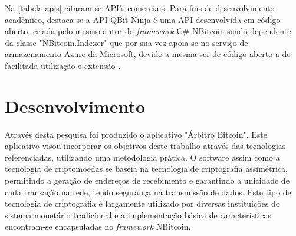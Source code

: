 \documentclass[
	article,			%
	11pt,				%
	oneside,			%
	a4paper,			%
	chapter=TITLE,		%
	section=TITLE,		%
	subsection=TITLE,	%
	subsubsection=TITLE, %
	english,			%
	brazil,				%
	sumario=tradicional
	]{ifrs-artigo-abntex2}
\begin{document}
\begin{table}[htb]
\end{table}

Na  \autoref{tabela-apis} citaram-se API's comerciais. Para fins de desenvolvimento acadêmico, destaca-se a API QBit Ninja é uma API desenvolvida em código aberto, criada pelo mesmo autor do \textit{framework} C{\#} NBitcoin sendo dependente da classe "NBitcoin.Indexer" que por sua vez apoia-se no serviço de armazenamento Azure da Microsoft, devido a mesma ser de código aberto a de facilitada utilização e extensão \cite{qbitNinja}.


\section{Desenvolvimento}
Através desta pesquisa foi produzido o aplicativo "Árbitro Bitcoin". Este aplicativo visou incorporar os objetivos deste trabalho através das tecnologias referenciadas, utilizando uma metodologia prática.
O software assim como a tecnologia de criptomoedas se baseia na tecnologia de criptografia assimétrica, permitindo a geração de endereços de recebimento e garantindo a unicidade de cada transação na rede, tendo segurança na transmissão de dados. Este tipo de tecnologia de criptografia é largamente utilizado por diversas instituições do sistema monetário tradicional \cite{rouse2018} e a implementação básica de características encontram-se encapsuladas no \textit{framework} NBitcoin.
\end{document}

